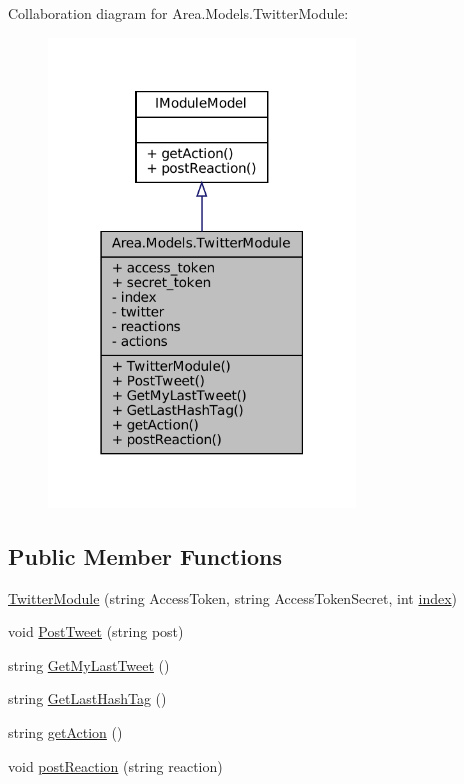 Collaboration diagram for Area.\+Models.\+Twitter\+Module\+:
\nopagebreak
\begin{figure}[H]
\begin{center}
\leavevmode
\includegraphics[width=231pt]{classArea_1_1Models_1_1TwitterModule__coll__graph}
\end{center}
\end{figure}
\subsection*{Public Member Functions}
\begin{DoxyCompactItemize}
\item 
\mbox{\hyperlink{classArea_1_1Models_1_1TwitterModule_aa0724f8694608093cb2f666a261b6a17}{Twitter\+Module}} (string Access\+Token, string Access\+Token\+Secret, int \mbox{\hyperlink{classArea_1_1Models_1_1TwitterModule_a287e1b50557ce5e03cf8a5cf70ed2696}{index}})
\item 
void \mbox{\hyperlink{classArea_1_1Models_1_1TwitterModule_a6baea70831508a7115930746687eabbd}{Post\+Tweet}} (string post)
\item 
string \mbox{\hyperlink{classArea_1_1Models_1_1TwitterModule_a8b1c5f0f64f1009c88eea9738d01839c}{Get\+My\+Last\+Tweet}} ()
\item 
string \mbox{\hyperlink{classArea_1_1Models_1_1TwitterModule_ae26abbc1e8056912e728d696a2111caa}{Get\+Last\+Hash\+Tag}} ()
\item 
string \mbox{\hyperlink{classArea_1_1Models_1_1TwitterModule_a80551107a68f78bf23d57948dcbe5a6d}{get\+Action}} ()
\item 
void \mbox{\hyperlink{classArea_1_1Models_1_1TwitterModule_a2dd56c4273c09ea000d0229bb9d19019}{post\+Reaction}} (string reaction)
\end{DoxyCompactItemize}
